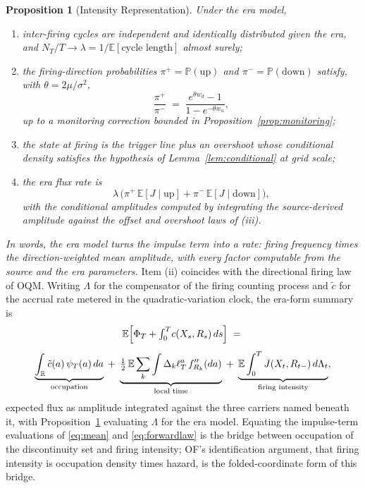 \documentclass[11pt,a4paper]{article}
\theoremstyle{definition}
\theoremstyle{plain}
\newtheorem{proposition}{Proposition}
\theoremstyle{remark}
\begin{document}
\begin{proposition}[Intensity Representation]\label{prop:intensity}
Under the era model,
\begin{enumerate}[label=(\roman*)]
\item inter-firing cycles are independent and identically distributed
given the era, and $N_T / T \to \lambda = 1/\mathbb{E}[\text{cycle
length}]$ almost surely;
\item the firing-direction probabilities $\pi^+ =
\mathbb{P}(\mathrm{up})$ and $\pi^- = \mathbb{P}(\mathrm{down})$
satisfy, with $\theta = 2\mu/\sigma^2$,
\[
\frac{\pi^+}{\pi^-} \;=\;
\frac{e^{\theta w_d} - 1}{1 - e^{-\theta w_u}},
\]
up to a monitoring correction bounded in Proposition~\ref{prop:monitoring};
\item the state at firing is the trigger line plus an overshoot whose conditional density satisfies the hypothesis of Lemma~\ref{lem:conditional} at grid scale;
\item the era flux rate is
\[
\lambda\,\big( \pi^+\, \mathbb{E}[J \mid \mathrm{up}]
+ \pi^-\, \mathbb{E}[J \mid \mathrm{down}]\big),
\]
with the conditional amplitudes computed by integrating the source-derived amplitude against the offset and overshoot laws of (iii).
\end{enumerate}
\end{proposition}

\emph{In words, the era model turns the impulse term into a rate: firing frequency times the direction-weighted mean amplitude, with every factor computable from the source and the era parameters.} 
Item (ii) coincides with the directional firing law of OQM. Writing $\Lambda$ for the compensator of the firing counting process and $\tilde c$ for the accrual rate metered in the quadratic-variation 
clock, the era-form summary is
\begin{equation}\label{eq:forwardlaw}
\begin{gathered}
\mathbb{E}\Big[ \Phi_T + {\textstyle\int_0^T} c(X_s, R_s)\, ds \Big]
\;=\; \\[4pt]
\underbrace{\int_{\mathbb{R}} \tilde c(a)\, \psi_T(a)\,
da}_{\textnormal{occupation}}
\;+\; \underbrace{\tfrac12\, \mathbb{E} \sum_k \int \Delta_k \ell^a_T\,
f''_{R_k}(da)}_{\textnormal{local time}}
\;+\; \underbrace{\mathbb{E} \int_0^T J(X_t, R_{t-})\,
d\Lambda_t}_{\textnormal{firing intensity}} ,
\end{gathered}
\end{equation}
expected flux as amplitude integrated against the three carriers named beneath it, with Proposition~\ref{prop:intensity} evaluating $\Lambda$ for the era model. Equating the impulse-term 
evaluations of \eqref{eq:mean} and \eqref{eq:forwardlaw} is the bridge between occupation of the discontinuity set and firing intensity; OF's identification argument,
that firing intensity is occupation density times hazard, is the folded-coordinate form of this bridge.
\end{document}
